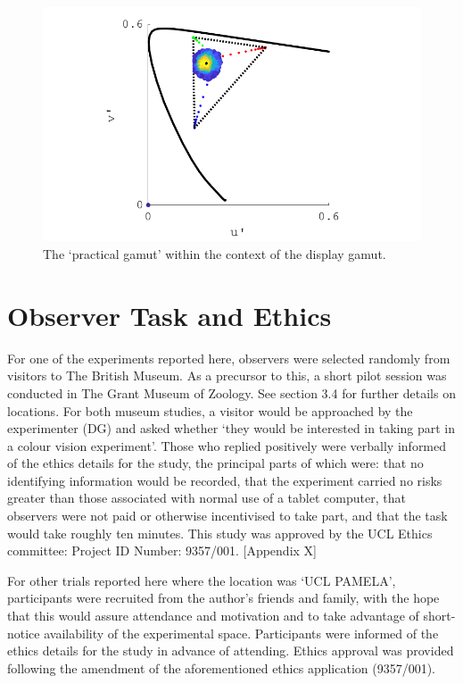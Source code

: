 \begin{figure}[hbp]
\includegraphics[width=\textwidth]{figs/tablet/practical_gamut2.pdf}
\caption{The `practical gamut' within the context of the display gamut.}
\label{fig:practical2}
\end{figure}

\section{Observer Task and Ethics}

For one of the experiments reported here, observers were selected randomly from visitors to The British Museum. As a precursor to this, a short pilot session was conducted in The Grant Museum of Zoology. See section 3.4 for further details on locations.
For both museum studies, a visitor would be approached by the experimenter (DG) and asked whether ‘they would be interested in taking part in a colour vision experiment’. Those who replied positively were verbally informed of the ethics details for the study, the principal parts of which were: that no identifying information would be recorded, that the experiment carried no risks greater than those associated with normal use of a tablet computer, that observers were not paid or otherwise incentivised to take part, and that the task would take roughly ten minutes. This study was approved by the UCL Ethics committee: Project ID Number: 9357/001. [Appendix X]

For other trials reported here where the location was ‘UCL PAMELA’, participants were recruited from the author’s friends and family, with the hope that this would assure attendance and motivation and to take advantage of short-notice availability of the experimental space. Participants were informed of the ethics details for the study in advance of attending. Ethics approval was provided following the amendment of the aforementioned ethics application (9357/001).

